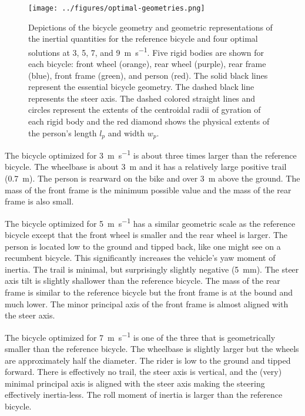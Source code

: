 \documentclass{bmd2019p}
\begin{document}
%
\begin{figure}
  \centering
  \texttt{[image: ../figures/optimal-geometries.png]}
  \label{fig:optimal-geometries}
  \caption{Depictions of the bicycle geometry and geometric representations of
    the inertial quantities for the reference bicycle and four optimal
    solutions at 3, 5, 7, and 9~\si{\meter\per\second}. Five rigid bodies are
    shown for each bicycle: front wheel (orange), rear wheel (purple), rear
    frame (blue), front frame (green), and person (red). The solid black lines
    represent the essential bicycle geometry. The dashed black line represents
    the steer axis. The dashed colored straight lines and circles represent the
    extents of the centroidal radii of gyration of each rigid body and the red
    diamond shows the physical extents of the person's length $l_p$ and width
    $w_p$.}
\end{figure}

The bicycle optimized for 3~\si{\meter\per\second} is about three times larger
than the reference bicycle. The wheelbase is about 3~\si{\meter} and it has a
relatively large positive trail (0.7~\si{\meter}). The person is rearward on
the bike and over 3~\si{\meter} above the ground. The mass of the front frame
is the minimum possible value and the mass of the rear frame is also small.

The bicycle optimized for 5~\si{\meter\per\second} has a similar geometric
scale as the reference bicycle except that the front wheel is smaller and the
rear wheel is larger. The person is located low to the ground and tipped back,
like one might see on a recumbent bicycle. This significantly increases the
vehicle's yaw moment of inertia. The trail is minimal, but surprisingly slightly
negative (5~\si{\milli\meter}). The steer axis tilt is slightly shallower than
the reference bicycle. The mass of the rear frame is similar to the reference
bicycle but the front frame is at the bound and much lower. The minor principal
axis of the front frame is almost aligned with the steer axis.

The bicycle optimized for 7~\si{\meter\per\second} is one of the three that is
geometrically smaller than the reference bicycle. The wheelbase is slightly
larger but the wheels are approximately half the diameter. The rider is low to
the ground and tipped forward. There is effectively no trail, the steer axis is
vertical, and the (very) minimal principal axis is aligned with the steer axis
making the steering effectively inertia-less. The roll moment of inertia is
larger than the reference bicycle.
\end{document}
